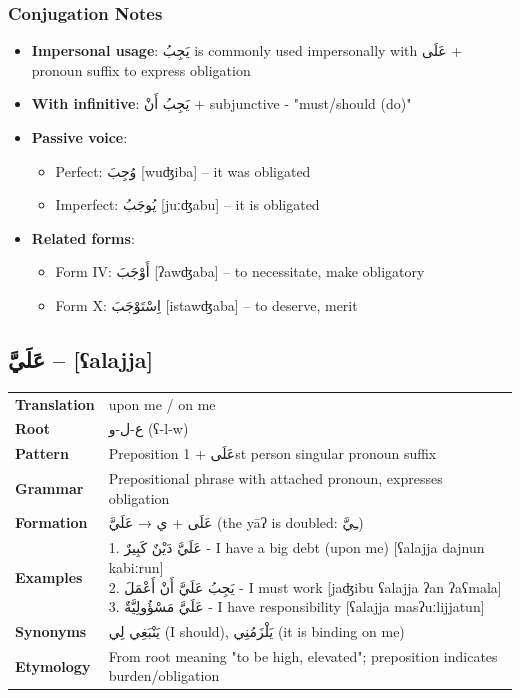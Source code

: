 \documentclass[letterpaper,12pt]{article}
\begin{document}
\subsubsection*{Conjugation Notes}
\begin{itemize}
  \item \textbf{Impersonal usage}: \textarabic{يَجِبُ} is commonly used impersonally with \textarabic{عَلَى} + pronoun suffix to express obligation
  \item \textbf{With infinitive}: \textarabic{يَجِبُ أَنْ + subjunctive} - "must/should (do)"
  \item \textbf{Passive voice}: 
    \begin{itemize}
      \item Perfect: \textarabic{وُجِبَ} [wuʤiba] – it was obligated
      \item Imperfect: \textarabic{يُوجَبُ} [juːʤabu] – it is obligated
    \end{itemize}
  \item \textbf{Related forms}:
    \begin{itemize}
      \item Form IV: \textarabic{أَوْجَبَ} [ʔawʤaba] – to necessitate, make obligatory
      \item Form X: \textarabic{اِسْتَوْجَبَ} [istawʤaba] – to deserve, merit
    \end{itemize}
\end{itemize}

\subsection{\textarabic{عَلَيَّ} – [ʕalajja]}

\begin{tabular}{p{3cm}p{10cm}}
\toprule
\textbf{Translation} & upon me / on me \\
\textbf{Root} & \textarabic{ع-ل-و} (ʕ-l-w) \\
\textbf{Pattern} & Preposition \textarabic{عَلَى} + 1st person singular pronoun suffix \\
\textbf{Grammar} & Prepositional phrase with attached pronoun, expresses obligation \\
\midrule
\textbf{Formation} & \textarabic{عَلَى + ي → عَلَيَّ} (the yāʔ is doubled: \textarabic{ـِيَّ}) \\
\midrule
\textbf{Examples} & \makecell[l]{\parbox{9.5cm}{
1. \textarabic{عَلَيَّ دَيْنٌ كَبِيرٌ} - I have a big debt (upon me) [ʕalajja dajnun kabiːrun]\\
2. \textarabic{يَجِبُ عَلَيَّ أَنْ أَعْمَلَ} - I must work [jaʤibu ʕalajja ʔan ʔaʕmala]\\
3. \textarabic{عَلَيَّ مَسْؤُولِيَّةٌ} - I have responsibility [ʕalajja masʔuːlijjatun]
}} \\
\midrule
\textbf{Synonyms} & \textarabic{يَنْبَغِي لِي} (I should), \textarabic{يَلْزَمُنِي} (it is binding on me) \\
\textbf{Etymology} & From root meaning "to be high, elevated"; preposition indicates burden/obligation \\
\bottomrule
\end{tabular}
\end{document}
